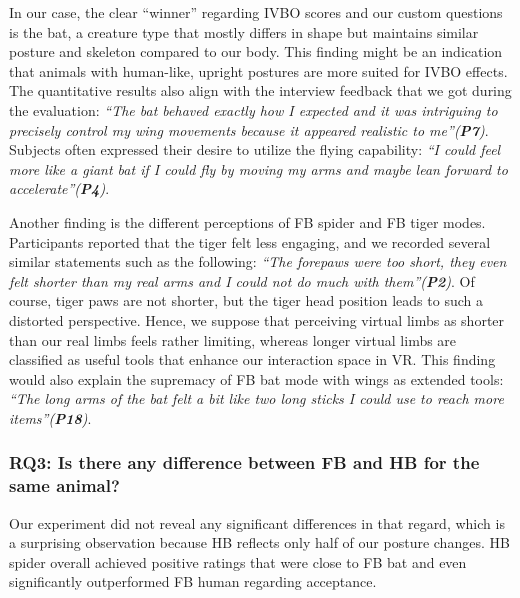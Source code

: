 In our case, the clear ``winner'' regarding IVBO scores and our custom questions is the bat, a creature type that mostly differs in shape but maintains similar posture and skeleton compared to our body. This finding might be an indication that animals with human-like, upright postures are more suited for IVBO effects. The quantitative results also align with the interview feedback that we got during the evaluation: \textit{``The bat behaved exactly how I expected and it was intriguing to precisely control my wing movements because it appeared realistic to me''(\textbf{P7})}. Subjects often expressed their desire to utilize the flying capability: \textit{``I could feel more like a giant bat if I could fly by moving my arms and maybe lean forward to accelerate''(\textbf{P4})}.



Another finding is the different perceptions of FB spider and FB tiger modes. Participants reported that the tiger felt less engaging, and we recorded several similar statements such as the following: \textit{``The forepaws were too short, they even felt shorter than my real arms and I could not do much with them''(\textbf{P2})}. Of course, tiger paws are not shorter, but the tiger head position leads to such a distorted perspective. Hence, we suppose that perceiving virtual limbs as shorter than our real limbs feels rather limiting, whereas longer virtual limbs are classified as useful tools that enhance our interaction space in VR. This finding would also explain the supremacy of FB bat mode with wings as extended tools: \textit{``The long arms of the bat felt a bit like two long sticks I could use to reach more items''(\textbf{P18})}. 


\subsubsection{\textbf{RQ3:} Is there any difference between FB and HB for the same animal?} Our experiment did not reveal any significant differences in that regard, which is a surprising observation because HB reflects only half of our posture changes. HB spider overall achieved positive ratings that were close to FB bat and even significantly outperformed FB human regarding acceptance.

